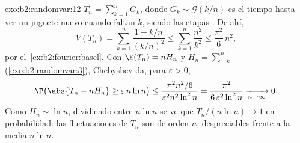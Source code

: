 \begin{solution}{exo:b2:randomvar:12}
$T_n = \sum_{k=1}^nG_k$, donde $G_k \sim \mathcal G(k/n)$ es el
tiempo hasta ver un juguete nuevo cuando faltan $k$, siendo las
etapas . De ahí,
\[
V(T_n) = \sum_{k=1}^n\frac{1 - k/n}{(k/n)^2}
\leq \sum_{k=1}^n\frac{n^2}{k^2}
\leq \frac{\pi^2}6\,n^2 ,
\]
por el~\cref{ex:b2:fourier:basel}. Con $\E(T_n) = nH_n$ y $H_n =
\sum_1^n\frac1k$ (\cref{exo:b2:randomvar:3}), Chebyshev da, para
$\varepsilon > 0$,
\[
\P\bigl(\abs{T_n - nH_n} \geq \varepsilon\,n\ln n\bigr)
\leq \frac{\pi^2n^2/6}{\varepsilon^2n^2\ln^2 n}
= \frac{\pi^2}{6\,\varepsilon^2\ln^2n}
\xrightarrow[n\to\infty]{} 0 .
\]
Como $H_n \sim \ln n$, dividiendo entre $n\ln n$ se ve que $T_n/(n\ln
n) \to 1$ en probabilidad: las fluctuaciones de $T_n$ son de orden
$n$, despreciables frente a la media $n\ln n$.
\end{solution}


